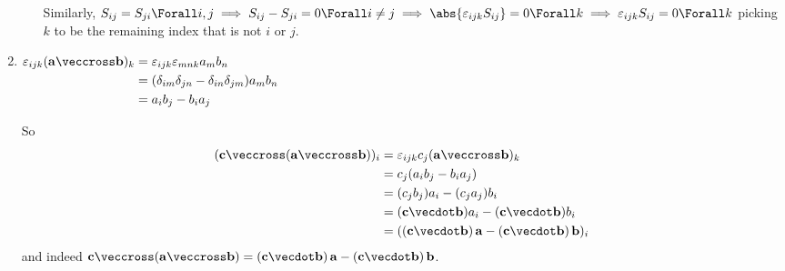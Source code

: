 \documentclass[fleqn,a4paper,11pt]{article}
\begin{document}
\begin{enumerate}[label=\textbf{\arabic*.}]
\begin{enumerate}[label=(\alph*)]
          Similarly,
          \(S_{ij} = S_{ji} \Forall i, j \implies
            S_{ij} - S_{ji} = 0 \Forall i \ne j \implies
            \abs{\epsilon_{ijk} S_{ij}} = 0 \Forall k \implies
            \epsilon_{ijk} S_{ij} = 0 \Forall k
            \) picking \(k\) to be the remaining index that is not \(i\) or
            \(j\).
   \end{enumerate}
  \item \(
   \begin{aligned}[t]
    \epsilon_{ijk} (\vec a \veccross \vec b)_k
     &= \epsilon_{ijk} \epsilon_{mnk} a_m b_n \\
     &= (\delta_{im} \delta_{jn} - \delta_{in} \delta_{jm}) a_m b_n \\
     &= a_i b_j - b_i a_j
   \end{aligned} \)

   So
   \begin{align*}
    (\vec c \veccross (\vec a \veccross \vec b))_i
     &= \epsilon_{ijk} c_j (\vec a \veccross \vec b)_k \\
     &= c_j (a_i b_j - b_i a_j) \\
     &= (c_j b_j) a_i - (c_j a_j) b_i \\
     &= (\vec c \vecdot \vec b) a_i - (\vec c \vecdot \vec b) b_i \\
     &= ((\vec c \vecdot \vec b)\,\vec a - (\vec c \vecdot \vec b)\,\vec b)_i
   \end{align*}
   and indeed
   \(\vec c \veccross (\vec a \veccross \vec b) =
     (\vec c \vecdot \vec b)\,\vec a - (\vec c \vecdot \vec b)\,\vec b\).
\end{enumerate}
\end{document}
